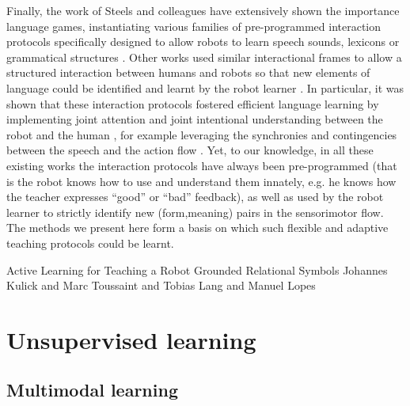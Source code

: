 Finally, the work of Steels and colleagues \cite{steels2012grounding,steels2002aibos} have extensively shown the importance language games, instantiating various families of pre-programmed interaction protocols specifically designed to allow robots to learn speech sounds\cite{de2000self,oudeyer2006self}, lexicons \cite{steels2002aibos} or grammatical structures \cite{steels06spatialLanguage, steels2008can}. Other works used similar interactional frames to allow a structured interaction between humans and robots so that new elements of language could be identified and learnt by the robot learner \cite{roy02a,lyon2012interactive,cangelosi06b,yu2004multimodal,cangelosi2010integration,sugita05a,dominey2005learning,cederborg2011imitating}. In particular, it was shown that these interaction protocols fostered efficient language learning by implementing joint attention and joint intentional understanding between the robot and the human \cite{kaplan2006challenges,yu2005role,yu2007unified}, for example leveraging the synchronies and contingencies between the speech and the action flow \cite{rohlfing2006can,schillingmann2011acoustic}. Yet, to our knowledge, in all these existing works the interaction protocols have always been pre-programmed (that is the robot knows how to use and understand them innately, e.g. he knows how the teacher expresses ``good'' or ``bad'' feedback), as well as used by the robot learner to strictly identify new (form,meaning) pairs in the sensorimotor flow. The methods we present here form a basis on which such flexible and adaptive teaching protocols could be learnt.


Active Learning for Teaching a Robot Grounded Relational Symbols
Johannes Kulick and Marc Toussaint and
Tobias Lang
and
Manuel Lopes


\section{Unsupervised learning}


\subsection{Multimodal learning}



